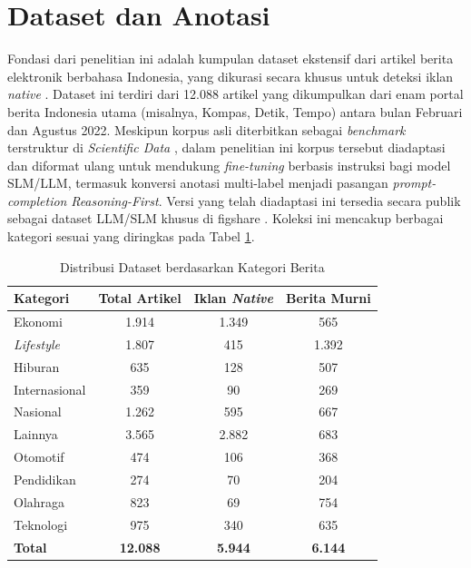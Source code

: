 \documentclass{ieeeaccess}
\begin{document}
\section{Dataset dan Anotasi}
\label{sec:dataset}
Fondasi dari penelitian ini adalah kumpulan dataset ekstensif dari artikel berita elektronik berbahasa Indonesia, yang dikurasi secara khusus untuk deteksi iklan \textit{native} \cite{b17}. Dataset ini terdiri dari 12.088 artikel yang dikumpulkan dari enam portal berita Indonesia utama (misalnya, Kompas, Detik, Tempo) antara bulan Februari dan Agustus 2022. Meskipun korpus asli diterbitkan sebagai \textit{benchmark} terstruktur di \textit{Scientific Data} \cite{b17}, dalam penelitian ini korpus tersebut diadaptasi dan diformat ulang untuk mendukung \textit{fine-tuning} berbasis instruksi bagi model SLM/LLM, termasuk konversi anotasi multi-label menjadi pasangan \textit{prompt-completion} \textit{Reasoning-First}. Versi yang telah diadaptasi ini tersedia secara publik sebagai dataset LLM/SLM khusus di figshare \cite{b68}. Koleksi ini mencakup berbagai kategori sesuai yang diringkas pada Tabel \ref{tab:dataset_stats}.

\begin{table}[htbp]
\caption{Distribusi Dataset berdasarkan Kategori Berita}
\label{tab:dataset_stats}
\begin{center}
\begin{tabular}{|l|c|c|c|}
\hline
\textbf{Kategori} & \textbf{Total Artikel} & \textbf{Iklan \textit{Native}} & \textbf{Berita Murni} \\
\hline
Ekonomi & 1.914 & 1.349 & 565 \\
\textit{Lifestyle} & 1.807 & 415 & 1.392 \\
Hiburan & 635 & 128 & 507 \\
Internasional & 359 & 90 & 269 \\
Nasional & 1.262 & 595 & 667 \\
Lainnya & 3.565 & 2.882 & 683 \\
Otomotif & 474 & 106 & 368 \\
Pendidikan & 274 & 70 & 204 \\
Olahraga & 823 & 69 & 754 \\
Teknologi & 975 & 340 & 635 \\
\hline
\textbf{Total} & \textbf{12.088} & \textbf{5.944} & \textbf{6.144} \\
\hline
\end{tabular}
\end{center}
\end{table}
\end{document}
